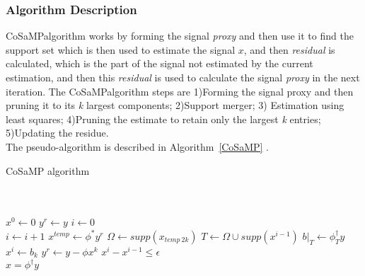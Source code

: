 \documentclass[12pt]{article}
\theoremstyle{definition}
\def\x{$x$\hspace{0.1in}}
\def\cosamp{CoSaMP\hspace{0.1in}}
\begin{document}
\subsubsection{Algorithm Description}
\label{Sec:cosamp_algo}
\cosamp algorithm works by forming the signal \textit{proxy} and then use it to find the support set
which is then used to estimate the signal \x, and then \textit{residual} is calculated, which
is the part of the signal not estimated by the current estimation, and then this \textit{residual}
is used to calculate the signal \textit{proxy} in the next iteration.
The \cosamp algorithm steps are 1)Forming the signal proxy and then pruning it to its \textit{k} largest
components; 2)Support merger; 3) Estimation using least squares; 4)Pruning the estimate to retain only the largest
\textit{k} entries; 5)Updating the residue.\\
The pseudo-algorithm is described in Algorithm~\ref{CoSaMP} \cite{Needell-CoSaMP}.

  \begin{algorithm}
   \caption{CoSaMP algorithm}
   \label{CoSaMP}
   \begin{algorithmic}
    \\
    \\
    \State $x^0 \gets 0$
    \State $y^r \gets y$
    \State $i \gets 0$\\
    \Repeat
    \State $i \gets i+1$
    \State $x^{temp} \gets \phi^\ast y^r$
    \State $\Omega \gets supp(x_{temp \ 2k})$
    \State $T \gets \Omega \cup supp(x^{i-1})$
    \State $b|_T \gets \phi_T^\dagger y$
    \State $x^i \gets b_k$
    \State $y^r \gets y - \phi x^k$
    \Until $x^{i} - x^{i-1} \leq \epsilon$ 
    \\
    \Return $x = \phi^\dagger y$
   \end{algorithmic}
\end{algorithm}
\end{document}

